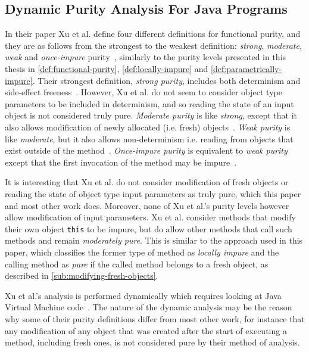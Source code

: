 \documentclass[a4paper,12pt]{article}
\begin{document}
\subsection{Dynamic Purity Analysis For Java Programs} \label{sub:Dynamic Purity Analysis For Java Programs}
In their paper Xu et al. define four different definitions for functional purity, and they are as follows from the strongest to the weakest definition: \textit{strong}, \textit{moderate}, \textit{weak} and \textit{once-impure} purity~\cite{xu2007dynamic}, similarly to the purity levels presented in this thesis in \autoref{def:functional-purity}, \autoref{def:locally-impure} and \autoref{def:parametrically-impure}. Their strongest definition, \textit{strong purity}, includes both determinism and side-effect freeness~\cite{xu2007dynamic}. However, Xu et al. do not seem to consider object type parameters to be included in determinism, and so reading the state of an input object is not considered truly pure. \textit{Moderate purity} is like \textit{strong}, except that it also allows modification of newly allocated (i.e. fresh) objects~\cite{xu2007dynamic}. \textit{Weak purity} is like \textit{moderate}, but it also allows non-determinism i.e. reading from objects that exist outside of the method~\cite{xu2007dynamic}. \textit{Once-impure purity} is equivalent to \textit{weak purity} except that the first invocation of the method may be impure~\cite{xu2007dynamic}.

It is interesting that Xu et al. do not consider modification of fresh objects or reading the state of object type input parameters as truly pure, which this paper and most other work does. Moreover, none of Xu et al.'s purity levels however allow modification of input parameters. Xu et al. consider methods that modify their own object \texttt{this} to be impure, but do allow other methods that call such methods and remain \textit{moderately pure}. This is similar to the approach used in this paper, which classifies the former type of method as \textit{locally impure} and the calling method as \textit{pure} if the called method belongs to a fresh object, as described in \autoref{sub:modifying-fresh-objects}.

Xu et al.'s analysis is performed dynamically which requires looking at Java Virtual Machine code~\cite{xu2007dynamic}. The nature of the dynamic analysis may be the reason why some of their purity definitions differ from most other work, for instance that any modification of any object that was created after the start of executing a method, including fresh ones, is not considered pure by their method of analysis.
\end{document}
